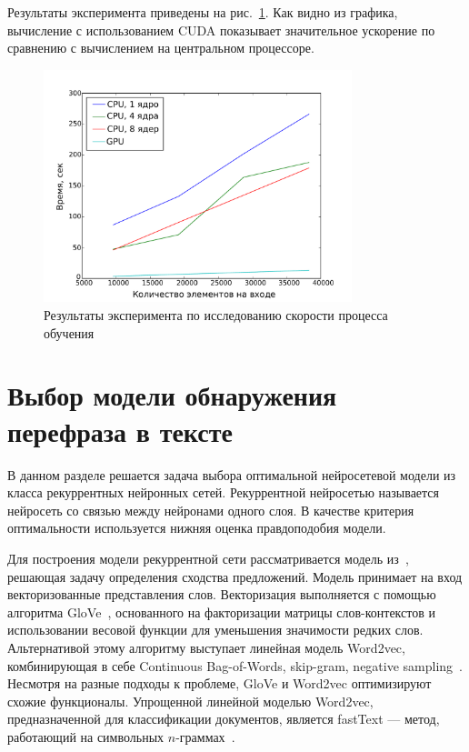 Результаты эксперимента приведены на рис.~\ref{fig:speed}. Как видно из графика, вычисление с использованием CUDA показывает значительное ускорение по сравнению с вычислением на центральном процессоре.

\begin{figure}[tb!]
 \centering
  \includegraphics[width=0.8\textwidth]{plots/popova/result.pdf}
 \caption{Результаты эксперимента по исследованию скорости процесса обучения}
 \label{fig:speed}
\end{figure}

























\section{Выбор модели обнаружения перефраза в тексте}
В данном разделе решается задача выбора оптимальной нейросетевой модели  из класса рекуррентных нейронных сетей. Рекуррентной нейросетью называется нейросеть со связью между нейронами одного слоя. В качестве критерия оптимальности используется нижняя оценка правдоподобия модели. 

Для построения модели рекуррентной сети рассматривается модель из~\cite{sanborn}, решающая задачу определения сходства предложений.
Модель принимает на вход векторизованные представления слов. Векторизация выполняется с помощью алгоритма GloVe~\cite{glove}, основанного на факторизации матрицы слов-контекстов и использовании весовой функции для уменьшения значимости редких слов. Альтернативой этому алгоритму выступает линейная модель Word2vec, комбинирующая в себе Continuous Bag-of-Words, skip-gram, negative sampling~\cite{word2vec}. Несмотря на разные подходы к проблеме, GloVe и Word2vec оптимизируют схожие функционалы. Упрощенной линейной моделью Word2vec, предназначенной для классификации документов, является fastText --- метод, работающий на символьных $n$-граммах~\cite{fasttext}. 

